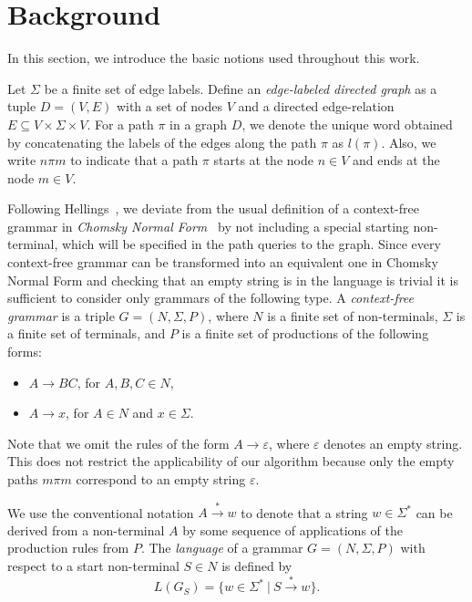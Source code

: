 \section{Background} \label{section_preliminaries}
In this section, we introduce the basic notions used throughout this work.

Let $\Sigma$ be a finite set of edge labels. Define an \textit{edge-labeled directed graph} as a tuple $D = (V, E)$ with a set of nodes $V$ and a directed edge-relation $E \subseteq V \times \Sigma \times V$.  For a path $\pi$ in a graph $D$, we denote the unique word obtained by concatenating the labels of the edges along the path $\pi$ as $l(\pi)$. Also, we write $n \pi m$ to indicate that a path $\pi$ starts at the node $n \in V$ and ends at the node $m \in V$.

Following Hellings~\cite{hellingsRelational}, we deviate from the usual definition of a context-free grammar in \textit{Chomsky Normal Form}~\cite{chomsky} by not including a special starting non-terminal, which will be specified in the path queries to the graph. Since every context-free grammar can be transformed into an equivalent one in Chomsky Normal Form and checking that an empty string is in the language is trivial it is sufficient to consider only grammars of the following type. A \textit{context-free grammar} is a triple $G = (N, \Sigma, P)$, where $N$ is a finite set of non-terminals, $\Sigma$ is a finite set of terminals, and $P$ is a finite set of productions of the following forms:

\begin{itemize}
    \item $A \rightarrow B C$, for $A,B,C \in N$,
    \item $A \rightarrow x$, for $A \in N$ and $x \in \Sigma$.   
\end{itemize}

Note that we omit the rules of the form $A \rightarrow \varepsilon$, where $\varepsilon$ denotes an empty string. This does not restrict the applicability of our algorithm because only the empty paths $m \pi m$ correspond to an empty string $\varepsilon$.

We use the conventional notation $A \xrightarrow{*} w$ to denote that a string $w \in \Sigma^*$ can be derived from a non-terminal $A$ by some sequence of applications of the production rules from $P$. The \textit{language} of a grammar $G = (N,\Sigma,P)$ with respect to a start non-terminal $S \in N$ is defined by $$L(G_S) = \{w \in \Sigma^*~|~S \xrightarrow{*} w\}.$$

